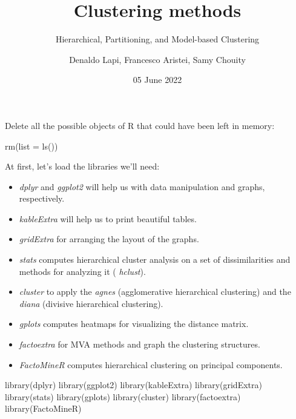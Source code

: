 \documentclass[
]{article}
\title{Clustering methods}
\subtitle{Hierarchical, Partitioning, and Model-based Clustering}
\author{Denaldo Lapi, Francesco Aristei, Samy Chouity}
\date{05 June 2022}
\newenvironment{Shaded}{\begin{snugshade}}{\end{snugshade}}
\newcommand{\AttributeTok}[1]{\textcolor[rgb]{0.77,0.63,0.00}{#1}}
\newcommand{\FunctionTok}[1]{\textcolor[rgb]{0.00,0.00,0.00}{#1}}
\newcommand{\NormalTok}[1]{#1}
\providecommand{\tightlist}{%
  \setlength{\itemsep}{0pt}\setlength{\parskip}{0pt}}
\begin{document}
\maketitle

\renewcommand*\contentsname{Outline}
{
\setcounter{tocdepth}{2}
\tableofcontents
}
Delete all the possible objects of R that could have been left in
memory:

\begin{Shaded}
\begin{Highlighting}[]
\FunctionTok{rm}\NormalTok{(}\AttributeTok{list =} \FunctionTok{ls}\NormalTok{())}
\end{Highlighting}
\end{Shaded}

At first, let's load the libraries we'll need:

\begin{itemize}
\tightlist
\item
  \emph{dplyr} and \emph{ggplot2} will help us with data manipulation
  and graphs, respectively.
\item
  \emph{kableExtra} will help us to print beautiful tables.
\item
  \emph{gridExtra} for arranging the layout of the graphs.
\item
  \emph{stats} computes hierarchical cluster analysis on a set of
  dissimilarities and methods for analyzing it ( \emph{hclust}).
\item
  \emph{cluster} to apply the \emph{agnes} (agglomerative hierarchical
  clustering) and the \emph{diana} (divisive hierarchical clustering).
\item
  \emph{gplots} computes heatmaps for visualizing the distance matrix.
\item
  \emph{factoextra} for MVA methods and graph the clustering structures.
\item
  \emph{FactoMineR} computes hierarchical clustering on principal
  components.
\end{itemize}

\begin{Shaded}
\begin{Highlighting}[]
\FunctionTok{library}\NormalTok{(dplyr)}
\FunctionTok{library}\NormalTok{(ggplot2)}
\FunctionTok{library}\NormalTok{(kableExtra)}
\FunctionTok{library}\NormalTok{(gridExtra)}
\FunctionTok{library}\NormalTok{(stats)}
\FunctionTok{library}\NormalTok{(gplots)}
\FunctionTok{library}\NormalTok{(cluster)}
\FunctionTok{library}\NormalTok{(factoextra)}
\FunctionTok{library}\NormalTok{(FactoMineR)}
\end{Highlighting}
\end{Shaded}
\end{document}
